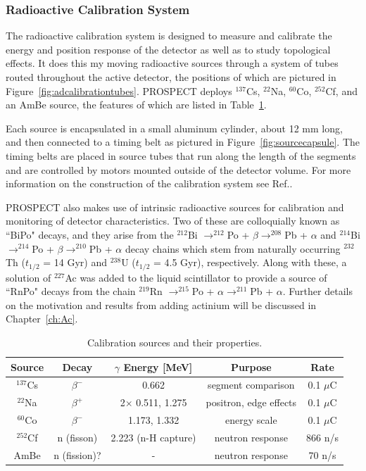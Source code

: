 \subsubsection{Radioactive Calibration System}

The radioactive calibration system is designed to measure and calibrate the energy and position response of the detector as well as to study topological effects. 
It does this my moving radioactive sources through a system of tubes routed throughout the active detector, the positions of which are pictured in Figure~\ref{fig:adcalibrationtubes}.
PROSPECT deploys $^{137}$Cs, $^{22}$Na, $^{60}$Co, $^{252}$Cf, and an AmBe source, the features of which are listed in Table~\ref{tab:Sources}.

Each source is encapsulated in a small aluminum cylinder, about 12 mm long, and then connected to a timing belt as pictured in Figure~\ref{fig:sourcecapsule}.
The timing belts are placed in source tubes that run along the length of the segments and are controlled by motors mounted outside of the detector volume. 
For more information on the construction of the calibration system see Ref.\cite{Ashenfelter:2019jzp}.

PROSPECT also makes use of intrinsic radioactive sources for calibration and monitoring of detector characteristics. 
Two of these are colloquially known as ``BiPo" decays, and they arise from the $^{212}$Bi $\rightarrow ^{212}$Po + $\beta \rightarrow ^{208}$Pb + $\alpha$ and $^{214}$Bi $\rightarrow ^{214}$Po + $\beta \rightarrow ^{210}$Pb + $\alpha$ decay chains which stem from naturally occurring $^{232}$Th ($t_{1/2}$ = 14 Gyr) and $^{238}$U ($t_{1/2}$ = 4.5 Gyr), respectively.
Along with these, a solution of $^{227}$Ac was added to the liquid scintillator to provide a source of ``RnPo" decays from the chain $^{219}$Rn $\rightarrow ^{215}$Po + $\alpha \rightarrow ^{211}$Pb + $\alpha$.
Further details on the motivation and results from adding actinium will be discussed in Chapter~\ref{ch:Ac}.


\begin{table}[t]
\begin{tabular}{|c|c|c|c|c|}
	\hline 
	\bf{Source} & \bf{Decay} & \bf{$\gamma$ Energy [MeV]} & Purpose & Rate \\ 
	\hline 
	$^{137}$Cs & $\beta^-$ & 0.662 & segment comparison & 0.1 $\mu$C \\ 
	\hline 
	$^{22}$Na & $\beta^+$ & 2$\times$ 0.511, 1.275 & positron, edge effects & 0.1 $\mu$C \\ 
	\hline 
	$^{60}$Co & $\beta^-$ & 1.173, 1.332 & energy scale & 0.1 $\mu$C \\ 
	\hline 
	$^{252}$Cf & n (fisson) & 2.223 (n-H capture) & neutron response & 866 n/s \\ 
	\hline 
	AmBe & n (fission)? & - & neutron response & 70 n/s \\ 
	\hline 
\end{tabular} 
\caption[Calibration sources]{Calibration sources and their properties.}
\label{tab:Sources}
\end{table}

